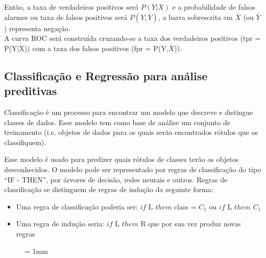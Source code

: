 Então, a taxa de verdadeiros positivos será $P(Y|X)$ e a probabilidade de falsos alarmes ou taxa de falsos positivos será $P(Y,\bar{Y})$, a barra sobrescrita em $\bar{X}$
(ou $\bar{Y}$) representa negação. \\
A curva ROC será construída cruzando-se a taxa dos verdadeiros positivos (tpr = P(Y|X)) com a taxa dos falsos positivos (fpr = P(Y,$\bar{X}$)).


\subsection{Classificação e Regressão para análise preditivas}

Classificação é um processo para encontrar um modelo que descreve e distingue classes de dados. 
Esse modelo tem como base de análise um conjunto de treinamento (i.e. objetos de dados para os quais 
serão encontrados rótulos que os classifiquem). 

Esse modelo é usado para predizer quais rótulos de classes terão os objetos desconhecidos.
O modelo pode ser representado por regras de classificação do tipo ``IF - THEN'', por árvores de decisão, redes neurais e outros. 
Regras de classificação se distinguem de regras de indução da seguinte forma:
\begin{itemize}
	\item Uma regra de classificação poderia ser: $if$ L $them$ class = $C_{1}$ ou $if$ L $them$  $C_{1}$
	\item Uma regra de indução seria: $ if$ L $them$ R que por sua vez produz novas regras 
\end{itemize}


\begin{figure}[ht] \unitlength= 1mm \thicklines
\end{figure}

\vspace{3cm} 

